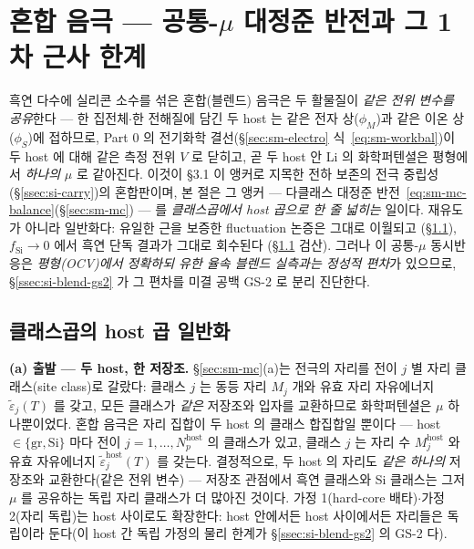 \section{혼합 음극 --- 공통-$\mu$ 대정준 반전과 그 1차 근사 한계}\label{sec:si-blend}
흑연 다수에 실리콘 소수를 섞은 혼합(블렌드) 음극은 두 활물질이 \emph{같은 전위 변수를 공유}한다 ---
한 집전체$\cdot$한 전해질에 담긴 두 host 는 같은 전자 상($\phi_M$)과 같은 이온 상($\phi_S$)에 접하므로,
Part 0 의 전기화학 결선(\S\ref{sec:sm-electro} 식~\eqref{eq:sm-workbal})이 두 host 에 대해 같은 측정
전위 $V$ 로 닫히고, 곧 두 host 안 Li 의 화학퍼텐셜은 평형에서 \emph{하나의} $\mu$ 로 같아진다. 이것이
§3.1 이 앵커로 지목한 전하 보존의 전극 중립성(\S\ref{ssec:si-carry})의 혼합판이며, 본 절은 그
앵커 --- 다클래스 대정준 반전~\eqref{eq:sm-mc-balance}(\S\ref{sec:sm-mc}) --- 를 \emph{클래스곱에서
host 곱으로 한 줄 넓히는} 일이다. 재유도가 아니라 일반화다: 유일한 근을 보증한 fluctuation 논증은 그대로 이월되고
(\S\ref{ssec:si-blend-derive}), $f_\mathrm{Si}\to0$ 에서 흑연 단독 결과가 그대로 회수된다
(\S\ref{ssec:si-blend-derive} 검산). 그러나 이 공통-$\mu$ 동시반응은 \emph{평형(OCV)에서 정확하되 유한
율속 블렌드 실측과는 정성적 편차}가 있으므로, \S\ref{ssec:si-blend-gs2} 가 그 편차를 미결 공백 GS-2 로
분리 진단한다.

\subsection{클래스곱의 host 곱 일반화}\label{ssec:si-blend-derive}
\textbf{(a) 출발 --- 두 host, 한 저장조.} \S\ref{sec:sm-mc}(a)는 전극의 자리를 전이 $j$ 별 자리
클래스(site class)로 갈랐다: 클래스 $j$ 는 동등 자리 $M_j$ 개와 유효 자리 자유에너지
$\tilde\varepsilon_j(T)$ 를 갖고, 모든 클래스가 \emph{같은} 저장조와 입자를 교환하므로 화학퍼텐셜은
$\mu$ 하나뿐이었다. 혼합 음극은 자리 집합이 두 host 의 클래스 합집합일 뿐이다 --- host $\in\{\mathrm{gr},
\mathrm{Si}\}$ 마다 전이 $j=1,\dots,N_p^\mathrm{host}$ 의 클래스가 있고, 클래스 $j$ 는 자리 수
$M_j^\mathrm{host}$ 와 유효 자유에너지 $\tilde\varepsilon_j^\mathrm{host}(T)$ 를 갖는다. 결정적으로, 두
host 의 자리도 \emph{같은 하나의} 저장조와 교환한다(같은 전위 변수) --- 저장조 관점에서 흑연 클래스와
Si 클래스는 그저 $\mu$ 를 공유하는 독립 자리 클래스가 더 많아진 것이다. 가정 1(hard-core 배타)$\cdot$가정
2(자리 독립)는 host 사이로도 확장한다: host 안에서든 host 사이에서든 자리들은 독립이라 둔다(이 host 간
독립 가정의 물리 한계가 \S\ref{ssec:si-blend-gs2} 의 GS-2 다).

